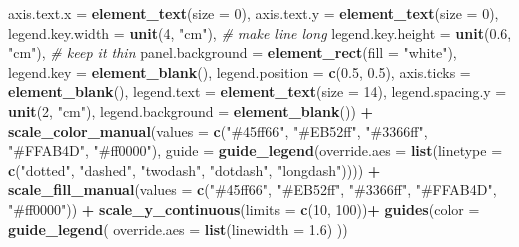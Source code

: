 \documentclass[
]{article}
\newenvironment{Shaded}{\begin{snugshade}}{\end{snugshade}}
\newcommand{\AttributeTok}[1]{\textcolor[rgb]{0.13,0.29,0.53}{#1}}
\newcommand{\CommentTok}[1]{\textcolor[rgb]{0.56,0.35,0.01}{\textit{#1}}}
\newcommand{\DecValTok}[1]{\textcolor[rgb]{0.00,0.00,0.81}{#1}}
\newcommand{\FloatTok}[1]{\textcolor[rgb]{0.00,0.00,0.81}{#1}}
\newcommand{\FunctionTok}[1]{\textcolor[rgb]{0.13,0.29,0.53}{\textbf{#1}}}
\newcommand{\NormalTok}[1]{#1}
\newcommand{\SpecialCharTok}[1]{\textcolor[rgb]{0.81,0.36,0.00}{\textbf{#1}}}
\newcommand{\StringTok}[1]{\textcolor[rgb]{0.31,0.60,0.02}{#1}}
\begin{document}
\begin{Shaded}
\begin{Highlighting}[]
        \AttributeTok{axis.text.x =} \FunctionTok{element\_text}\NormalTok{(}\AttributeTok{size =} \DecValTok{0}\NormalTok{),}
        \AttributeTok{axis.text.y =} \FunctionTok{element\_text}\NormalTok{(}\AttributeTok{size =} \DecValTok{0}\NormalTok{),}
        \AttributeTok{legend.key.width  =} \FunctionTok{unit}\NormalTok{(}\DecValTok{4}\NormalTok{, }\StringTok{"cm"}\NormalTok{),  }\CommentTok{\# make line long}
        \AttributeTok{legend.key.height =} \FunctionTok{unit}\NormalTok{(}\FloatTok{0.6}\NormalTok{, }\StringTok{"cm"}\NormalTok{), }\CommentTok{\# keep it thin}
        \AttributeTok{panel.background =} \FunctionTok{element\_rect}\NormalTok{(}\AttributeTok{fill =} \StringTok{"white"}\NormalTok{),}
        \AttributeTok{legend.key =} \FunctionTok{element\_blank}\NormalTok{(),}
        \AttributeTok{legend.position =} \FunctionTok{c}\NormalTok{(}\FloatTok{0.5}\NormalTok{, }\FloatTok{0.5}\NormalTok{),}
        \AttributeTok{axis.ticks =} \FunctionTok{element\_blank}\NormalTok{(),}
        \AttributeTok{legend.text  =} \FunctionTok{element\_text}\NormalTok{(}\AttributeTok{size =} \DecValTok{14}\NormalTok{),}
        \AttributeTok{legend.spacing.y =} \FunctionTok{unit}\NormalTok{(}\DecValTok{2}\NormalTok{, }\StringTok{"cm"}\NormalTok{),}
        \AttributeTok{legend.background =} \FunctionTok{element\_blank}\NormalTok{()) }\SpecialCharTok{+}
  \FunctionTok{scale\_color\_manual}\NormalTok{(}\AttributeTok{values =} \FunctionTok{c}\NormalTok{(}\StringTok{"\#45ff66"}\NormalTok{, }\StringTok{"\#EB52ff"}\NormalTok{, }\StringTok{"\#3366ff"}\NormalTok{, }\StringTok{"\#FFAB4D"}\NormalTok{, }\StringTok{"\#ff0000"}\NormalTok{),}
                     \AttributeTok{guide =} \FunctionTok{guide\_legend}\NormalTok{(}\AttributeTok{override.aes =} \FunctionTok{list}\NormalTok{(}\AttributeTok{linetype =} \FunctionTok{c}\NormalTok{(}\StringTok{"dotted"}\NormalTok{, }\StringTok{"dashed"}\NormalTok{, }\StringTok{"twodash"}\NormalTok{, }\StringTok{"dotdash"}\NormalTok{, }\StringTok{"longdash"}\NormalTok{)))) }\SpecialCharTok{+}
  \FunctionTok{scale\_fill\_manual}\NormalTok{(}\AttributeTok{values =} \FunctionTok{c}\NormalTok{(}\StringTok{"\#45ff66"}\NormalTok{, }\StringTok{"\#EB52ff"}\NormalTok{, }\StringTok{"\#3366ff"}\NormalTok{, }\StringTok{"\#FFAB4D"}\NormalTok{, }\StringTok{"\#ff0000"}\NormalTok{)) }\SpecialCharTok{+}
  \FunctionTok{scale\_y\_continuous}\NormalTok{(}\AttributeTok{limits =} \FunctionTok{c}\NormalTok{(}\DecValTok{10}\NormalTok{, }\DecValTok{100}\NormalTok{))}\SpecialCharTok{+}
  \FunctionTok{guides}\NormalTok{(}\AttributeTok{color =} \FunctionTok{guide\_legend}\NormalTok{(}
    \AttributeTok{override.aes =} \FunctionTok{list}\NormalTok{(}\AttributeTok{linewidth =} \FloatTok{1.6}\NormalTok{)}
\NormalTok{  ))}
\end{Highlighting}
\end{Shaded}
\end{document}
